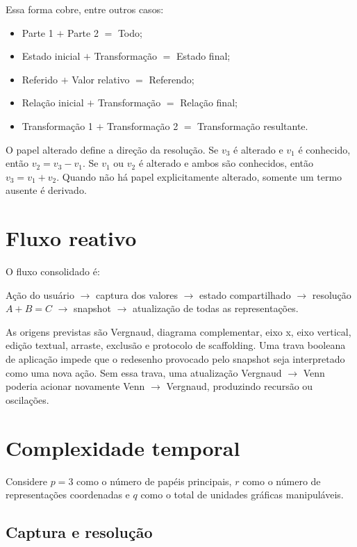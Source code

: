 \documentclass[12pt,a4paper]{article}
\begin{document}
Essa forma cobre, entre outros casos:
\begin{itemize}[noitemsep]
  \item Parte 1 $+$ Parte 2 $=$ Todo;
  \item Estado inicial $+$ Transformação $=$ Estado final;
  \item Referido $+$ Valor relativo $=$ Referendo;
  \item Relação inicial $+$ Transformação $=$ Relação final;
  \item Transformação 1 $+$ Transformação 2 $=$ Transformação resultante.
\end{itemize}

O papel alterado define a direção da resolução. Se $v_3$ é alterado e $v_1$ é conhecido, então $v_2=v_3-v_1$. Se $v_1$ ou $v_2$ é alterado e ambos são conhecidos, então $v_3=v_1+v_2$. Quando não há papel explicitamente alterado, somente um termo ausente é derivado.

\section{Fluxo reativo}

O fluxo consolidado é:

\begin{center}
Ação do usuário $\rightarrow$ captura dos valores $\rightarrow$ estado compartilhado $\rightarrow$ resolução $A+B=C$ $\rightarrow$ snapshot $\rightarrow$ atualização de todas as representações.
\end{center}

As origens previstas são Vergnaud, diagrama complementar, eixo x, eixo vertical, edição textual, arraste, exclusão e protocolo de scaffolding. Uma trava booleana de aplicação impede que o redesenho provocado pelo snapshot seja interpretado como uma nova ação. Sem essa trava, uma atualização Vergnaud $\rightarrow$ Venn poderia acionar novamente Venn $\rightarrow$ Vergnaud, produzindo recursão ou oscilações.

\section{Complexidade temporal}

Considere $p=3$ como o número de papéis principais, $r$ como o número de representações coordenadas e $q$ como o total de unidades gráficas manipuláveis.

\subsection{Captura e resolução}
\end{document}
